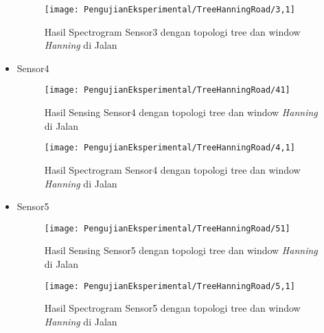 \begin{itemize}
\begin{figure}[H]
	\centering
	\texttt{[image: PengujianEksperimental/TreeHanningRoad/3,1]}
	\caption[Hasil Spectrogram Sensor3 dengan topologi tree dan window {\it Hanning} di Jalan]{Hasil Spectrogram Sensor3 dengan topologi tree dan window {\it Hanning} di Jalan} 
	\label{fig:hasilJalanTreeHann3,1}
\end{figure}

\item Sensor4
\begin{figure}[H]
	\centering
	\texttt{[image: PengujianEksperimental/TreeHanningRoad/41]}
	\caption[Hasil Sensing Sensor4 dengan topologi tree dan window {\it Hanning} di Jalan]{Hasil Sensing Sensor4 dengan topologi tree dan window {\it Hanning} di Jalan} 
	\label{fig:hasilJalanTreeHann41}
\end{figure}

\begin{figure}[H]
	\centering
	\texttt{[image: PengujianEksperimental/TreeHanningRoad/4,1]}
	\caption[Hasil Spectrogram Sensor4 dengan topologi tree dan window {\it Hanning} di Jalan]{Hasil Spectrogram Sensor4 dengan topologi tree dan window {\it Hanning} di Jalan} 
	\label{fig:hasilJalanTreeHann4,1}
\end{figure}

\item Sensor5
\begin{figure}[H]
	\centering
	\texttt{[image: PengujianEksperimental/TreeHanningRoad/51]}
	\caption[Hasil Sensing Sensor5 dengan topologi tree dan window {\it Hanning} di Jalan]{Hasil Sensing Sensor5 dengan topologi tree dan window {\it Hanning} di Jalan} 
	\label{fig:hasilJalanTreeHann51}
\end{figure}

\begin{figure}[H]
	\centering
	\texttt{[image: PengujianEksperimental/TreeHanningRoad/5,1]}
	\caption[Hasil Spectrogram Sensor5 dengan topologi tree dan window {\it Hanning} di Jalan]{Hasil Spectrogram Sensor5 dengan topologi tree dan window {\it Hanning} di Jalan} 
	\label{fig:hasilJalanTreeHann5,1}
\end{figure}
\end{itemize}

